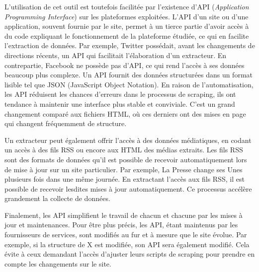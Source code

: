 \documentclass[
  letterpaper,
  DIV=11,
  numbers=noendperiod]{scrreprt}
\begin{document}
L'utilisation de cet outil est toutefois facilitée par l'existence d'API
(\emph{Application Programming Interface}) sur les plateformes
exploitées. L'API d'un site ou d'une application, souvent fournie par le
site, permet à un tierce partie d'avoir accès à du code expliquant le
fonctionnement de la plateforme étudiée, ce qui en facilite l'extraction
de données. Par exemple, Twitter possédait, avant les changements de
directions récents, un API qui facilitait l'élaboration d'un extracteur.
En contrepartie, Facebook ne possède pas d'API, ce qui rend l'accès à
ses données beaucoup plus complexe. Un API fournit des données
structurées dans un format lisible tel que JSON (JavaScript Object
Notation). En raison de l'automatisation, les API réduisent les chances
d'erreurs dans le processus de scraping, ils ont tendance à maintenir
une interface plus stable et conviviale. C'est un grand changement
comparé aux fichiers HTML, où ces derniers ont des mises en page qui
changent fréquemment de structure.

Un extracteur peut également offrir l'accès à des données médiatiques,
en codant un accès à des fils RSS ou encore aux HTML des médias
extraits. Les fils RSS sont des formats de données qu'il est possible de
recevoir automatiquement lors de mise à jour sur un site particulier.
Par exemple, La Presse change ses Unes plusieurs fois dans une même
journée. En extractant l'accès aux fils RSS, il est possible de recevoir
lesdites mises à jour automatiquement. Ce processus accélère grandement
la collecte de données.

Finalement, les API simplifient le travail de chacun et chacune par les
mises à jour et maintenances. Pour être plus précis, les API, étant
maintenus par les fournisseurs de services, sont modifiés au fur et à
mesure que le site évolue. Par exemple, si la structure de X est
modifiée, son API sera également modifié. Cela évite à ceux demandant
l'accès d'ajuster leurs scripts de scraping pour prendre en compte les
changements sur le site.
\end{document}
